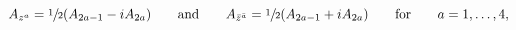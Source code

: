 \begin{equation}
 A_{z^a}=\sfrac{1}{2}(A_{2a-1}-iA_{2a})\qquad\text{and}\qquad
 A_{\bar{z}^{\bar{a}}}=\sfrac{1}{2}(A_{2a-1}+iA_{2a})\qquad\text{for}\qquad
 a=1,\ldots,4,
\end{equation}

